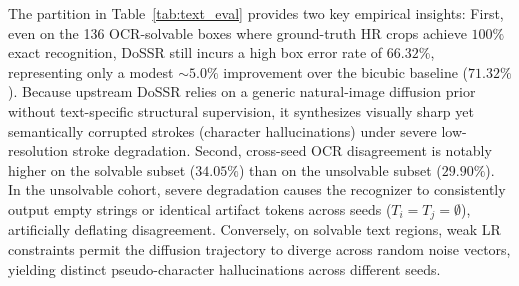 \documentclass[11pt]{article}
\begin{document}
\begin{table}[ht]
\centering
\small
\caption{Text-region evaluation on RealSRVal (RapidOCR \texttt{--rec-only --rotate-vertical}).}
\label{tab:text_eval}
\end{table}

The partition in Table~\ref{tab:text_eval} provides two key empirical insights:
First, even on the 136 OCR-solvable boxes where ground-truth HR crops achieve $100\%$ exact recognition, DoSSR still incurs a high box error rate of $66.32\%$, representing only a modest $\sim 5.0\%$ improvement over the bicubic baseline ($71.32\%$). Because upstream DoSSR relies on a generic natural-image diffusion prior without text-specific structural supervision, it synthesizes visually sharp yet semantically corrupted strokes (character hallucinations) under severe low-resolution stroke degradation.
Second, cross-seed OCR disagreement is notably higher on the solvable subset ($34.05\%$) than on the unsolvable subset ($29.90\%$). In the unsolvable cohort, severe degradation causes the recognizer to consistently output empty strings or identical artifact tokens across seeds ($T_i = T_j = \emptyset$), artificially deflating disagreement. Conversely, on solvable text regions, weak LR constraints permit the diffusion trajectory to diverge across random noise vectors, yielding distinct pseudo-character hallucinations across different seeds.
\end{document}
